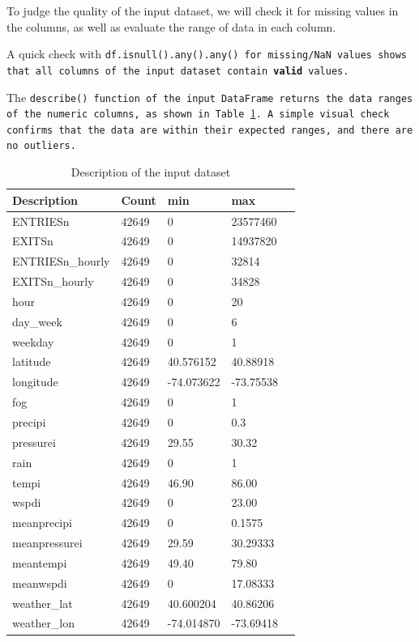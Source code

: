 \documentclass{article}
\begin{document}
To judge the quality of the input dataset, we will check it for missing values in the columns, as well as evaluate the range of data in each column.

A quick check with \tt df.isnull().any().any() \rm for missing/NaN values shows that all columns of the input dataset contain \textbf{valid} values. 

The \tt describe() \rm function of the input DataFrame returns the data ranges of the numeric columns, as shown in Table \ref{tab:input-set-describe}. A simple visual check confirms that the data are within their expected ranges, and there are no outliers.

\begin{table}[]
\centering
\begin{tabular}{l| llll}
\hline
Description      & Count &  min & max           \\
\hline
ENTRIESn         & 42649 &  0   & 23577460  \\
EXITSn           & 42649 &  0   & 14937820  \\
ENTRIESn\_hourly & 42649 &  0   & 32814  \\
EXITSn\_hourly   & 42649 &  0   & 34828  \\
hour             & 42649 &  0   & 20  \\
day\_week        & 42649 &  0   & 6  \\
weekday          & 42649 &  0   & 1  \\
latitude         & 42649 &  40.576152  & 40.88918  \\
longitude        & 42649 &  -74.073622 & -73.75538 \\
fog              & 42649 &  0   & 1  \\
precipi          & 42649 &  0   & 0.3  \\
pressurei        & 42649 &  29.55  & 30.32  \\
rain             & 42649 &  0   & 1  \\
tempi            & 42649 &  46.90  & 86.00  \\
wspdi            & 42649 &  0   & 23.00  \\
meanprecipi      & 42649 &  0   & 0.1575  \\
meanpressurei    & 42649 &  29.59 & 30.29333  \\
meantempi        & 42649 &  49.40  & 79.80  \\
meanwspdi        & 42649 &  0   & 17.08333  \\
weather\_lat     & 42649 &  40.600204  & 40.86206  \\
weather\_lon     & 42649 &  -74.014870 & -73.69418 \\
\hline
\end{tabular}
\caption{Description of the input dataset}
\label{tab:input-set-describe}
\end{table}
\end{document}
